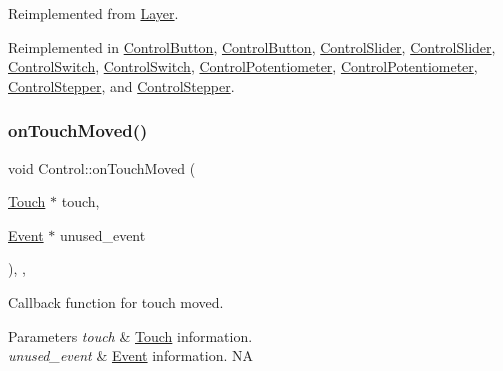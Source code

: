 Reimplemented from \hyperlink{classLayer_a9dbcca0eab3b0cd3cdc279615c604413}{Layer}.



Reimplemented in \hyperlink{classControlButton_a7597744c683964152429472a358b3fd2}{Control\+Button}, \hyperlink{classControlButton_a6f562dc0b399591189883ea7788603d7}{Control\+Button}, \hyperlink{classControlSlider_a9ba0559605c93e08dc4548261cbc2773}{Control\+Slider}, \hyperlink{classControlSlider_acdda8fa6365ab06db757c0a525c5108e}{Control\+Slider}, \hyperlink{classControlSwitch_a6976aba81f0846eb827114efc06301d3}{Control\+Switch}, \hyperlink{classControlSwitch_a13db70a616ea0e992710fc8041792f66}{Control\+Switch}, \hyperlink{classControlPotentiometer_adb487a04c463b3cfbf63be0957cee24c}{Control\+Potentiometer}, \hyperlink{classControlPotentiometer_adfd4029e5b390ba94a0ba0373adbc5d9}{Control\+Potentiometer}, \hyperlink{classControlStepper_a7934349dae09881fce7a72d4985d0154}{Control\+Stepper}, and \hyperlink{classControlStepper_a55e6582294a0520d21e397c3a58cf57b}{Control\+Stepper}.

\mbox{\label{classControl_a26d2e6af053319dc605949678f726622}} 
\subsubsection{\texorpdfstring{on\+Touch\+Moved()}{onTouchMoved()}\hspace{0.1cm}{\footnotesize\ttfamily [1/2]}}
{\footnotesize\ttfamily void Control\+::on\+Touch\+Moved (\begin{DoxyParamCaption}\item[{\hyperlink{classTouch}{Touch} $\ast$}]{touch,  }\item[{\hyperlink{classEvent}{Event} $\ast$}]{unused\+\_\+event }\end{DoxyParamCaption})\hspace{0.3cm}{\ttfamily [inline]}, {\ttfamily [override]}, {\ttfamily [virtual]}}

Callback function for touch moved.


\begin{DoxyParams}{Parameters}
{\em touch} & \hyperlink{classTouch}{Touch} information. \\
\hline
{\em unused\+\_\+event} & \hyperlink{classEvent}{Event} information.  NA \\
\hline
\end{DoxyParams}


